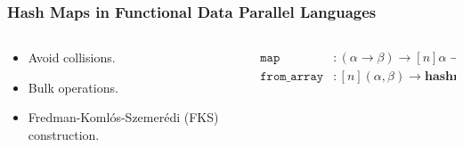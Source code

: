 \documentclass[aspectratio=169]{beamer}
\newcommand{\kw}[1]{\ensuremath{\mathtt{#1}}}
\newcommand{\Map}{\kw{map}}
\begin{document}
\begin{frame}\frametitle{Hash Maps in Functional Data Parallel Languages}
  \begin{columns}
  \begin{column}{.38\textwidth}
  \hfill
  \begin{itemize}
    \item Avoid collisions.
    \item Bulk operations.
    \item<2-> Fredman-Komlós-Szemerédi (FKS) construction. 
  \end{itemize}
  \hfill  
  \end{column}
  \hfill
  \begin{column}{.6\textwidth}
    \begin{align*}
      \Map & : (\alpha \to \beta) \to [n]\alpha \to [n]\beta \\
      \mathtt{from\_array} & : [n](\alpha, \beta) \to \mathbf{hashmap} ~ \alpha ~ \beta
    \end{align*} 
  \end{column}
  \end{columns}
\end{frame}
\end{document}

